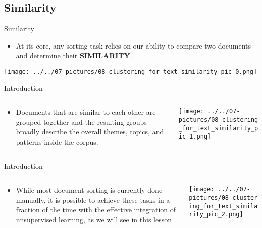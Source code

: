 \documentclass[11pt]{beamer}
\begin{document}
\subsection{Similarity \\ \scalebox{0.8}{Sorting documents}}
\begin{frame}{Similarity}
	\begin{itemize}
		\item At its core, any sorting task relies on our ability to compare two documents and determine their \textbf{SIMILARITY}. 
	\end{itemize}
	\begin{center}
	\texttt{[image: ../../07-pictures/08\_clustering\_for\_text\_similarity\_pic\_0.png]}
	\end{center}
\end{frame}
\begin{frame}{Introduction}
\begin{columns}[T] %
\begin{column}{.48\textwidth}
        \begin{itemize}
		\item Documents that are similar to each other are grouped together and the resulting groups broadly describe the overall themes, topics, and patterns inside the corpus.
        \end{itemize}
\end{column}%
\hfill%
\begin{column}{.48\textwidth}
        \texttt{[image: ../../07-pictures/08\_clustering\_for\_text\_similarity\_pic\_1.png]}
\end{column}%
\end{columns}
\end{frame}
\begin{frame}{Introduction}
\begin{columns}[T] %
\begin{column}{.48\textwidth}
        \begin{itemize}
		\item While most document sorting is currently done manually, it is possible to achieve these tasks in a fraction of the time with the effective integration of unsupervised learning, as we will see in this lesson
        \end{itemize}
\end{column}%
\hfill%
\begin{column}{.48\textwidth}
        \texttt{[image: ../../07-pictures/08\_clustering\_for\_text\_similarity\_pic\_2.png]}
\end{column}%
\end{columns}
\end{frame}
\end{document}
